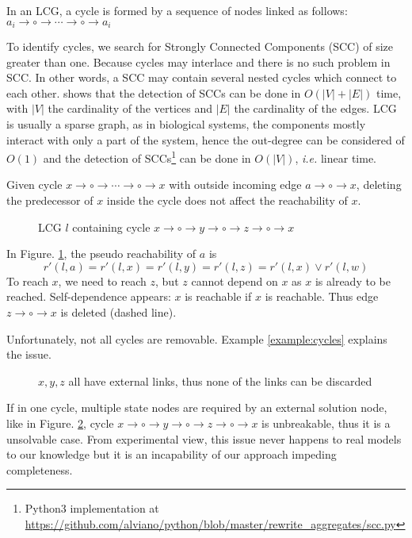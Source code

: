\documentclass{entcs}
\begin{document}

\begin{definition}[cycle]
In an LCG, a cycle is formed by a sequence of nodes linked as follows: $a_i\to \circ \to \cdots \to \circ \to a_i$
\end{definition}

To identify cycles, we search for Strongly Connected Components (SCC) of size greater than one.
Because cycles may interlace and there is no such problem in SCC.
In other words, a SCC may contain several nested cycles which connect to each other.
\cite{tarjan1972} shows that the detection of SCCs can be done in $O (|V|+|E|)$ time, with $|V|$ the cardinality of the vertices and $|E|$ the cardinality of the edges.
LCG is usually a sparse graph, as in biological systems, the components mostly interact with only a part of the system, hence the out-degree can be considered of $O (1)$ and the detection of SCCs\footnote{Python3 implementation at \url{https://github.com/alviano/python/blob/master/rewrite_aggregates/scc.py}} can be done in $O(|V|)$, \textit{i.e.} linear time.

\begin{theorem}
\label{th:break_cycle}
Given cycle $x\to \circ \to \cdots \to \circ \to x$ with outside incoming edge $a\to \circ \to x$, deleting the predecessor of $x$ inside the cycle does not affect the reachability of $x$.
\end{theorem}
\begin{example}
    \begin{figure}[ht]
        \centering
        
        \caption{LCG $l$ containing cycle $x\to \circ \to y \to \circ \to z\to \circ \to x$}
        \label{cycle1}
    \end{figure}
    
    In Figure. \ref{cycle1}, the pseudo reachability of $a$ is 
    $$r'(l,a)=r'(l,x)=r'(l,y)=r'(l,z)=r'(l,x)\lor r'(l,w)$$
    To reach $x$, we need to reach $z$, but $z$ cannot depend on $x$ as $x$ is already to be reached. 
    Self-dependence appears: $x$ is reachable if $x$ is reachable.
    Thus edge $z\to \circ \to x$ is deleted (dashed line).
\end{example}
Unfortunately, not all cycles are removable. Example \ref{example:cycles} explains the issue.
\begin{example}\label{example:cycles}
    \begin{figure}[ht]
        \centering
        
        \caption{$x,y,z$ all have external links, thus none of the links can be discarded}
        \label{cycle3}
    \end{figure}
    If in one cycle, multiple state nodes are required by an external solution node, like in Figure. \ref{cycle3}, cycle $x\to \circ \to y \to \circ \to z\to \circ \to x$ is unbreakable, thus it is a unsolvable case. 
    From experimental view, this issue never happens to real models to our knowledge but it is an incapability of our approach impeding completeness.
\end{example}
\end{document}
